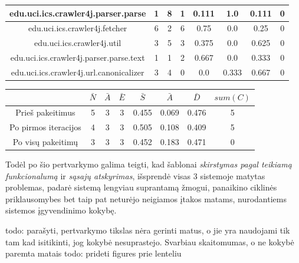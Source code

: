 \begin{center}
\begin{tabular}{|c|c|c|c|c|c|c|c|}
        \hline
        edu.uci.ics.crawler4j.parser.parse & 1 & 8 & 1 & 0.111 & 1.0 & 0.111 & 0 \\
        \hline
        edu.uci.ics.crawler4j.fetcher & 6 & 2 & 6 & 0.75 & 0.0 & 0.25 & 0 \\
        \hline
        edu.uci.ics.crawler4j.util & 3 & 5 & 3 & 0.375 & 0.0 & 0.625 & 0 \\
        \hline
        edu.uci.ics.crawler4j.parser.parse.text & 1 & 1 & 2 & 0.667 & 0.0 & 0.333 & 0 \\
        \hline
        edu.uci.ics.crawler4j.url.canonicalizer & 3 & 4 & 0 & 0.0 & 0.333 & 0.667 & 0 \\
        \hline
    \end{tabular}
    \begin{tabular}{|c|c|c|c|c|c|c|c|}
        \hline
        & $\bar{N}$ & $\bar{A}$ & $\bar{E}$ & $\bar{S}$ & $\bar{A}$ & $\bar{D}$ & $sum(C)$\\ [0.5ex]
        \hline\hline
        Prieš pakeitimus & 5 & 3 & 3 & 0.455 & 0.069 & 0.476 & 5\\
        \hline
        Po pirmos iteracijos & 4 & 3 & 3 & 0.505 & 0.108 & 0.409 & 5 \\
        \hline
        Po visų pakeitimų & 3 & 3 & 3 & 0.452 & 0.183 & 0.471 & 0 \\
        \hline
    \end{tabular}
\end{center}
Todėl po šio pertvarkymo galima teigti, kad šablonai \textit{skirstymas pagal teikiamą funkcionalumą} ir \textit{sąsajų atskyrimas}, išsprendė visas 3 sistemoje matytas problemas,
padarė sistemą lengviau suprantamą žmogui, panaikino ciklinės priklausomybes bet taip pat neturėjo neigiamos įtakos matams, nurodantiems
sistemos įgyvendinimo kokybę.

todo: parašyti, pertvarkymo tikslas nėra gerinti matus, o jie yra naudojami tik tam kad isitikinti, jog kokybė nesuprastejo. Svarbiau skaitomumas, o ne kokybė paremta matais
todo: prideti figures prie lenteliu